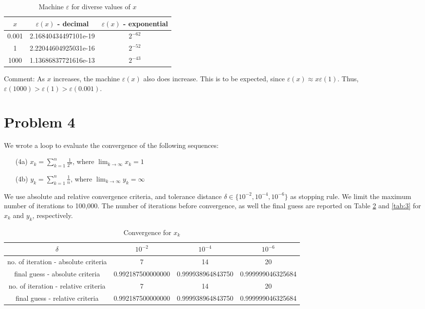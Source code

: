 \documentclass[11pt]{article}
\newcommand{\1}{\mathbbm{1}}
\begin{document}
	\begin{table}[h]
		\centering
		\begin{tabular}{ | c | c | c |}
			\hline
			\hline
			$x$ & $\varepsilon(x)$ - decimal & $\varepsilon(x)$ - exponential \\	
			\hline
			0.001 & 2.16840434497101e-19 & $2^{-62}$ \\ \hline
			1 & 2.22044604925031e-16 & $2^{-52}$ \\ \hline
			1000 & 1.13686837721616e-13 & $2^{-43}$ \\
			\hline
			\hline
		\end{tabular} 
		\caption{Machine $\varepsilon$ for diverse values of $x$}
		\label{tab:1}
	\end{table}
Comment: As $x$ increases, the machine $\varepsilon(x)$ also does increase. This is to be expected, since $\varepsilon(x)\approx x\varepsilon(1)$. Thus, $\varepsilon(1000)>\varepsilon(1)>\varepsilon(0.001)$.
	
\section*{Problem 4} 
We wrote a loop to evaluate the convergence of the following sequences: 
\begin{enumerate}
	\item[(4a)] $x_k=\sum_{k=1}^{n}\frac{1}{2^n}$, where $\lim_{k\rightarrow\infty}x_k=1$
	\item[(4b)] $y_k=\sum_{k=1}^{n}\frac{1}{n}$, where $\lim_{k\rightarrow\infty}y_k=\infty$
\end{enumerate}
We use absolute and relative convergence criteria, and tolerance distance $\delta\in\{10^{-2},10^{-4},10^{-6}\}$ as stopping rule. We limit the maximum number of iterations to 100,000. The number of iterations before convergence, as well the final guess are reported on Table \ref{tab:2} and \ref{tab:3} for $x_k$ and $y_k$, respectively.

	\begin{table}[h]
	\centering
	\begin{tabular}{|c | c | c | c |}
		\hline
		\hline
		$\delta	$							&$10^{-2}$ 			&$10^{-4}$ 			&$10^{-6}$          \\
		\hline
		no. of iteration - absolute criteria&7					&14					&20               \\
		final guess - absolute criteria		&0.992187500000000	&0.999938964843750	&0.999999046325684\\
		no. of iteration - relative criteria&7					&14					&20               \\
		final guess - relative criteria		&0.992187500000000	&0.999938964843750	&0.999999046325684\\
		\hline
		\hline
	\end{tabular} 
	\caption{Convergence for $x_k$}
	\label{tab:2}
\end{table}
\end{document}
